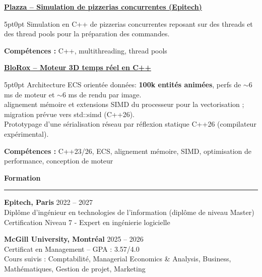\documentclass[9pt]{extarticle}
\begin{document}
\par\vspace{8pt}

\underline{\bfseries Plazza -- Simulation de pizzerias concurrentes (Epitech)}
\par
\begin{adjustwidth}{5pt}{0pt}
    Simulation en C++ de pizzerias concurrentes reposant sur des threads et des thread pools pour la préparation des commandes.
\end{adjustwidth}
\par
{\bfseries Compétences :} C++, multithreading, thread pools

\par\vspace{8pt}

\underline{\bfseries \href{https://github.com/paulogarithm/blorox}{BloRox} -- Moteur 3D temps réel en C++}
\par
\begin{adjustwidth}{5pt}{0pt}
	Architecture ECS orientée données: {\bfseries 100k entités animées}, perfs de $\sim$6 ms de moteur et $\sim$6 ms de rendu par image. \\
	alignement mémoire et extensions SIMD du processeur pour la vectorisation ; migration prévue vers {\ttfamily std::simd} (C++26). \\
	Prototypage d'une sérialisation réseau par réflexion statique C++26 (compilateur expérimental).
\end{adjustwidth}
\par
{\bfseries Compétences :} C++23/26, ECS, alignement mémoire, SIMD, optimisation de performance, conception de moteur
\par\vspace{8pt}


{\large\bfseries Formation}
\par\vspace{-8pt}
\rule{\linewidth}{0.4pt}
\par\vspace{5pt}

{\bfseries Epitech, Paris} \hfill 2022 -- 2027 \\
Diplôme d'ingénieur en technologies de l'information (diplôme de niveau Master) \\
Certification Niveau 7 - Expert en ingénierie logicielle

\vspace{6pt}

{\bfseries McGill University, Montréal} \hfill 2025 -- 2026 \\
Certificat en Management -- GPA : 3.57/4.0 \\
Cours suivis : Comptabilité, Managerial Economics \& Analysis, Business, Mathématiques, Gestion de projet, Marketing
\end{document}
